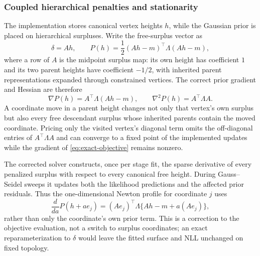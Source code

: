 \documentclass[11pt]{article}
\begin{document}
\subsubsection{Coupled hierarchical penalties and stationarity}
The implementation stores canonical vertex heights $h$, while the Gaussian prior is placed on
hierarchical surpluses. Write the free-surplus vector as
\[
\delta=Ah,
\qquad
P(h)=\frac12(Ah-m)^\top\Lambda(Ah-m),
\]
where a row of $A$ is the midpoint surplus map: its own height has coefficient $1$ and its two
parent heights have coefficient $-1/2$, with inherited parent representations expanded through
constrained vertices. The correct prior gradient and Hessian are therefore
\begin{equation}\label{eq:coupled-prior-gradient}
\nabla P(h)=A^\top\Lambda(Ah-m),
\qquad
\nabla^2P(h)=A^\top\Lambda A.
\end{equation}
A coordinate move in a parent height changes not only that vertex's own surplus but also every free
descendant surplus whose inherited parents contain the moved coordinate. Pricing only the visited
vertex's diagonal term omits the off-diagonal entries of $A^\top\Lambda A$ and can converge to a
fixed point of the implemented updates while the gradient of \eqref{eq:exact-objective} remains
nonzero.

The corrected solver constructs, once per stage fit, the sparse derivative of every penalized
surplus with respect to every canonical free height. During Gauss--Seidel sweeps it updates both the
likelihood predictions and the affected prior residuals. Thus the one-dimensional Newton profile for
coordinate $j$ uses
\[
\frac{d}{da}P(h+a e_j)
=(Ae_j)^\top\Lambda\{Ah-m+a(Ae_j)\},
\]
rather than only the coordinate's own prior term. This is a correction to the objective evaluation,
not a switch to surplus coordinates; an exact reparameterization to $\delta$ would leave the fitted
surface and NLL unchanged on fixed topology.
\end{document}
